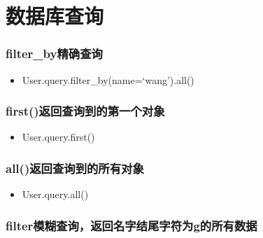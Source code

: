 \documentclass[11pt]{article}
\providecommand{\tightlist}{%
      \setlength{\itemsep}{0pt}\setlength{\parskip}{0pt}}
\begin{document}
    \hypertarget{ux6570ux636eux5e93ux67e5ux8be2}{%
\section{数据库查询}\label{ux6570ux636eux5e93ux67e5ux8be2}}

\hypertarget{filter_byux7cbeux786eux67e5ux8be2}{%
\subsubsection{filter\_by精确查询}\label{filter_byux7cbeux786eux67e5ux8be2}}

\begin{itemize}
\tightlist
\item
  User.query.filter\_by(name=`wang').all()
\end{itemize}

\hypertarget{firstux8fd4ux56deux67e5ux8be2ux5230ux7684ux7b2cux4e00ux4e2aux5bf9ux8c61}{%
\subsubsection{first()返回查询到的第一个对象}\label{firstux8fd4ux56deux67e5ux8be2ux5230ux7684ux7b2cux4e00ux4e2aux5bf9ux8c61}}

\begin{itemize}
\tightlist
\item
  User.query.first()
\end{itemize}

\hypertarget{allux8fd4ux56deux67e5ux8be2ux5230ux7684ux6240ux6709ux5bf9ux8c61}{%
\subsubsection{all()返回查询到的所有对象}\label{allux8fd4ux56deux67e5ux8be2ux5230ux7684ux6240ux6709ux5bf9ux8c61}}

\begin{itemize}
\tightlist
\item
  User.query.all()
\end{itemize}

\hypertarget{filterux6a21ux7ccaux67e5ux8be2ux8fd4ux56deux540dux5b57ux7ed3ux5c3eux5b57ux7b26ux4e3agux7684ux6240ux6709ux6570ux636e}{%
\subsubsection{filter模糊查询，返回名字结尾字符为g的所有数据}\label{filterux6a21ux7ccaux67e5ux8be2ux8fd4ux56deux540dux5b57ux7ed3ux5c3eux5b57ux7b26ux4e3agux7684ux6240ux6709ux6570ux636e}}
\end{document}
